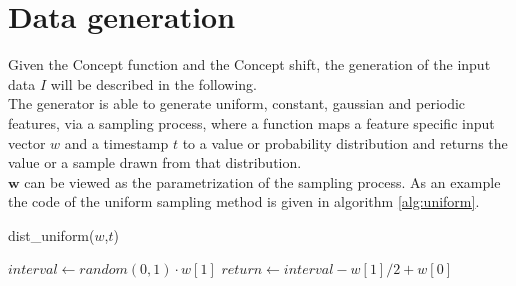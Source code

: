 \documentclass[12pt,a4paper,oneside,ngerman]{article}
\theoremstyle{plain}
\renewcommand{\vec}[1]{\boldsymbol{#1}}	%
\begin{document}
	\section{Data generation} 
	Given the Concept function and the Concept shift, the generation of the input data $I$ will be described in the following.\\
	The generator is able to generate uniform, constant, gaussian and periodic features, via a sampling process, where a function maps a feature specific input vector $w$ and a timestamp $t$ to a value or probability distribution and returns the value or a sample drawn from that distribution.\\
	$\vec{w}$ can be viewed as the parametrization of the sampling process. As an example the code of the uniform sampling method is given in algorithm \ref{alg:uniform}.\\
	
	\begin{algorithm}[h!]
		\caption{dist\_uniform($w$,$t$)}\label{alg:uniform}
		\begin{algorithmic}
			\State $interval \gets random(0,1) \cdot w[1]$ 
			\State $return \gets interval-w[1]/2 + w[0]$ 
		\end{algorithmic}
	\end{algorithm}
	
\end{document}
